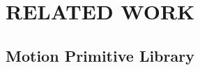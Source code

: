 \section{RELATED WORK}
\begin{comment}
\subsection{Quadrotor Trajectory Planning}

The classical planners formulate trajectory planning as a nonlinear optimization problem and online optimizes a feasible trajectory, which trades off motion smoothness, dynamical feasibility, and collision violation. However, these planners requires large computational power to extract free space or environment representation methods, 

such as occupancy grid map____, ESDF____, SFC____. Observing this shortcoming, our community has also been exploring more lightweight environment representation methods. Mapless____ kd-tree . Meanwhile, the motion primitive planners____ generate a bunch of trajectories in a sampling space, use the kd-tree to select safe trajectories, and then pick up a trajectory with the minimum user-defined cost to execute. Because the sampled trajectories are not optimized and the sampling resolution is limited, the quality of the generated trajectory cannot always be guaranteed.
In summary, the above methods cannot realize the wish that enjoys both efficiency and efficacy.
\end{comment}

\subsection{Motion Primitive Library}

